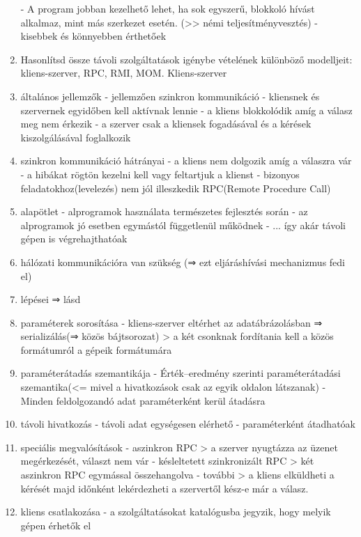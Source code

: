 \documentclass[twoside, a4paper, 12pt]{article}
\begin{document}
\begin{enumerate}
        - A program jobban kezelhető lehet, ha sok egyszerű, blokkoló hívást alkalmaz, mint más szerkezet esetén. (>> némi teljesítményvesztés)
        - kisebbek és könnyebben érthetőek 
    \item  Hasonlítsd össze távoli szolgáltatások igénybe vételének különböző modelljeit: kliens-szerver, RPC, RMI, MOM.
        Kliens-szerver
    \item általános jellemzők
        - jellemzően szinkron kommunikáció
        - kliensnek és szervernek egyidőben kell aktívnak lennie
        - a kliens blokkolódik amíg a válasz meg nem érkezik
        - a szerver csak a kliensek fogadásával és a kérések kiszolgálásával foglalkozik
    \item szinkron kommunikáció hátrányai
        - a kliens nem dolgozik amíg a válaszra vár
        - a hibákat rögtön kezelni kell vagy feltartjuk a klienst
        - bizonyos feladatokhoz(levelezés) nem jól illeszkedik
        RPC(Remote Procedure Call)
    \item alapötlet
        - alprogramok használata természetes fejlesztés során
        - az alprogramok jó esetben egymástól függetlenül működnek
        - ... így akár távoli gépen is végrehajthatóak
    \item hálózati kommunikációra van szükség (⇒ ezt eljáráshívási mechanizmus fedi el)
    \item lépései ⇒ lásd 
    \item paraméterek sorosítása
        - kliens-szerver eltérhet az adatábrázolásban ⇒ serializálás(⇒ közös bájtsorozat)
        > a két csonknak fordítania kell a közös formátumról a gépeik formátumára
    \item paraméterátadás szemantikája
        - Érték–eredmény szerinti paraméterátadási szemantika(<=  mivel a hivatkozások csak az egyik oldalon látszanak)
        - Minden feldolgozandó adat paraméterként kerül átadásra
    \item távoli hivatkozás
        - távoli adat egységesen elérhető
        - paraméterként átadhatóak
    \item speciális megvalósítások
        - aszinkron RPC
        > a szerver nyugtázza az üzenet megérkezését, választ nem vár
        - késleltetett szinkronizált RPC
        > két aszinkron RPC egymással összehangolva
        - további
        > a kliens elküldheti a kérését majd időnként lekérdezheti a szervertől kész-e már a válasz.
    \item kliens csatlakozása
        - a szolgáltatásokat katalógusba jegyzik, hogy melyik gépen érhetők el

\end{enumerate}
\end{document}
